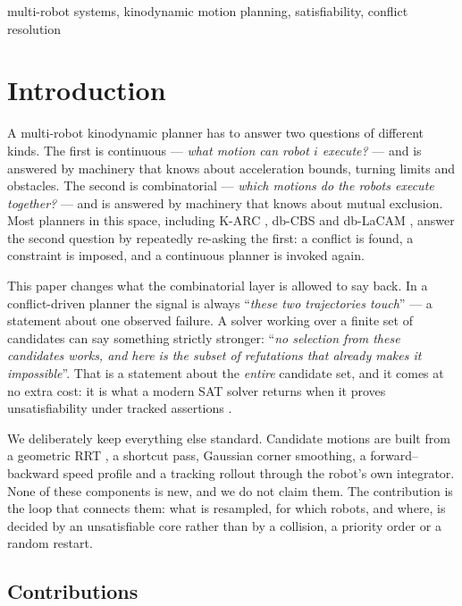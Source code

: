 \documentclass[conference]{IEEEtran}
\theoremstyle{plain}
\theoremstyle{definition}
\begin{document}
\begin{IEEEkeywords}
multi-robot systems, kinodynamic motion planning, satisfiability, conflict resolution
\end{IEEEkeywords}

\section{Introduction}

A multi-robot kinodynamic planner has to answer two questions of different kinds. The first
is continuous --- \emph{what motion can robot $i$ execute?} --- and is answered by machinery
that knows about acceleration bounds, turning limits and obstacles. The second is
combinatorial --- \emph{which motions do the robots execute together?} --- and is answered by
machinery that knows about mutual exclusion. Most planners in this space, including K-ARC
\cite{karc2025}, db-CBS \cite{dbcbs2024} and db-LaCAM \cite{dblacam2025}, answer the second
question by repeatedly re-asking the first: a conflict is found, a constraint is imposed,
and a continuous planner is invoked again.

This paper changes what the combinatorial layer is allowed to say back. In a
conflict-driven planner the signal is always ``\emph{these two trajectories touch}'' --- a
statement about one observed failure. A solver working over a finite set of candidates can
say something strictly stronger: ``\emph{no selection from these candidates works, and here
is the subset of refutations that already makes it impossible}''. That is a statement about
the \emph{entire} candidate set, and it comes at no extra cost: it is what a modern SAT
solver returns when it proves unsatisfiability under tracked assertions \cite{z3}.

We deliberately keep everything else standard. Candidate motions are built from a geometric
RRT \cite{lavalle2001}, a shortcut pass, Gaussian corner smoothing, a forward--backward speed
profile and a tracking rollout through the robot's own integrator. None of these components
is new, and we do not claim them. The contribution is the loop that connects them: what is
resampled, for which robots, and where, is decided by an unsatisfiable core rather than by a
collision, a priority order or a random restart.

\subsection*{Contributions}
\end{document}
